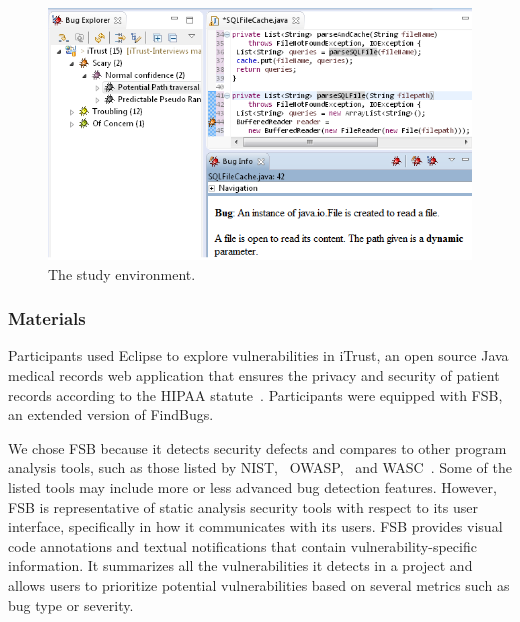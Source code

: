 \documentclass{acm_proc_article-sp}
\begin{document}
\begin{figure}
	\centering
	\includegraphics[width=\columnwidth]{Images/environment.png}
	\caption{The study environment.}
	\label{fig:environment} 
\end{figure}



\subsubsection{Materials}
Participants used Eclipse to explore vulnerabilities in iTrust, an open source Java medical records web application that ensures the privacy and security of patient records according to the HIPAA statute~\cite{HIPAA}. 
Participants were equipped with FSB, an extended version of FindBugs.

We chose FSB because it detects security defects and compares to other program analysis tools, such as those listed by NIST,~\cite{SecurityAnalyzers} OWASP,~\cite{OWASPSCA} and WASC~\cite{CodeAnalysis}. 
Some of the listed tools may include more or less advanced bug detection features. 
However, FSB is representative of static analysis security tools with respect to its user interface, specifically in how it communicates with its users.
FSB provides visual code annotations and textual notifications that contain vulnerability-specific information.
It summarizes all the vulnerabilities it detects in a project and allows users to prioritize potential vulnerabilities based on several metrics such as bug type or severity.
\end{document}
